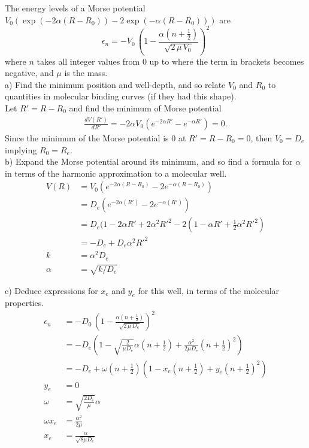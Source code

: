 \documentclass{article}
\begin{document}
The energy levels of a Morse potential $V_0(\exp(-2\alpha (R-R_0)) -2 \exp(-\alpha (R-R_0)))$
are
\begin{equation}
\epsilon_n = -V_0\, \left( 1 - \frac{\alpha (n+\frac{1}{2})}{\sqrt{2\, \mu\, V_0}} \right)^2
\end{equation}
where $n$ takes all integer values from 0 up to where the term in brackets
becomes negative, and $\mu$ is the mass.
\\

\noindent a) Find the minimum position and well-depth, and so relate $V_0$ and $R_0$ to
quantities in molecular binding curves (if they had this shape).
\\

{\color{blue} Let $R'=R-R_0$ and find the minimum of Morse potential
  \begin{align}
    \frac{dV(R')}{dR'} = -2\alpha V_0(e^{-2\alpha R'}-e^{-\alpha R'}) = 0.
  \end{align}
  Since the minimum of the Morse potential is 0 at $R'=R-R_0=0$, then $V_0=D_e$ implying
  $R_0=R_e$.
}
\\

\noindent b) Expand the Morse potential around its minimum, and so find a formula for $\alpha$
in terms of the harmonic approximation to a molecular well.
{\color{blue}
\begin{align*}
  V(R) & = V_0(e^{-2\alpha(R-R_0)}-2e^{-\alpha(R-R_0)}) \\
  & = D_e(e^{-2\alpha(R')}-2e^{-\alpha(R')}) \\
  & = D_e(1-2\alpha R' + 2\alpha^2R'^2 -2(1-\alpha R' +\frac{1}{2}\alpha^2R'^2) \\
  & = -D_e + D_e\alpha^2R'^2 \\
  k & = \alpha^2D_e \\
  \alpha & = \sqrt{k/D_e}
\end{align*}
}

\noindent c) Deduce expressions for $x_e$ and $y_e$ for this well, in terms of the molecular
properties.
{\color{blue}
  \begin{align*}
    \epsilon_n & = -D_0\, \left( 1 - \frac{\alpha (n+\frac{1}{2})}{\sqrt{2\, \mu\, D_e}} \right)^2 \\
    & = - D_e(1 - \sqrt{\frac{2}{\mu D_e}}\alpha(n+\frac{1}{2}) +\frac{\alpha^2}{2\mu D_e}(n+\frac{1}{2})^2)\\
    & = - D_e + \omega(n+\frac{1}{2})(1-x_e(n+\frac{1}{2})+y_e(n+\frac{1}{2})^2) \\
    y_e & = 0 \\
    \omega & = \sqrt{\frac{2 D_e}{\mu}}\alpha \\
    \omega x_e & = \frac{\alpha^2}{2\mu} \\
    x_e & = \frac{\alpha}{\sqrt{8\mu D_e}}
  \end{align*}
  }
\end{document}
